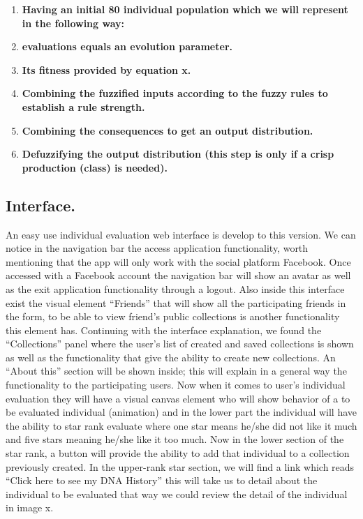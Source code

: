 \begin{enumerate}
	\item  \textbf{Having an initial 80 individual population which we will represent in the following way:}
	
	
	
	\item  \textbf{evaluations equals an evolution parameter.}
	 
	\item  \textbf{Its fitness provided by equation x.} 
	\item  \textbf{Combining the fuzzified inputs according to the fuzzy rules to establish a rule strength.} 
	\item  \textbf{Combining the consequences to get an output distribution.}
	\item  \textbf{Defuzzifying the  output distribution (this step is only if a crisp production (class) is needed).}
\end{enumerate}











\subsection{Interface.} 

An easy use individual evaluation web interface is develop to this version.  We can notice in the navigation bar the access application functionality, worth mentioning that the app will only work with the social platform Facebook. Once accessed with a Facebook account the navigation bar will show an avatar as well as the exit application functionality through a logout. Also inside this interface exist the visual element “Friends” that will show all the participating friends in the form, to be able to view friend’s public collections is another functionality this element has.
Continuing with the interface explanation, we found the “Collections” panel where the user's list of created and saved collections is shown as well as the functionality that give the ability to create new collections. An “About this” section will be shown inside; this will explain in a general way the functionality to the participating users. Now when it comes to user’s individual evaluation they will have a visual canvas element who will show behavior of a to be evaluated individual (animation) and in the lower part the individual will have the ability to star rank evaluate where one star means he/she did not like it much and five stars meaning he/she like it too much. Now in the lower section of the star rank, a button will provide the ability to add that individual to a collection previously created. In the upper-rank star section, we will find a link which reads “Click here to see my DNA History” this will take us to detail about the individual to be evaluated that way we could review the detail of the individual in image x.

